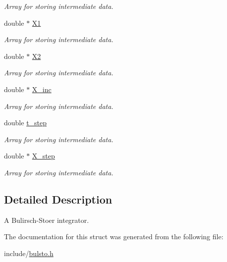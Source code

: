 \begin{DoxyCompactItemize}
\begin{DoxyCompactList}\small\item\em Array for storing intermediate data. \end{DoxyCompactList}\item 
\hypertarget{structbulsto_ae042d246b8cc4fc2dca7eeb2b7de41a0}{double $\ast$ \hyperlink{structbulsto_ae042d246b8cc4fc2dca7eeb2b7de41a0}{X1}}\label{structbulsto_ae042d246b8cc4fc2dca7eeb2b7de41a0}

\begin{DoxyCompactList}\small\item\em Array for storing intermediate data. \end{DoxyCompactList}\item 
\hypertarget{structbulsto_a07d3f69a611b1f3d346615d8936672ce}{double $\ast$ \hyperlink{structbulsto_a07d3f69a611b1f3d346615d8936672ce}{X2}}\label{structbulsto_a07d3f69a611b1f3d346615d8936672ce}

\begin{DoxyCompactList}\small\item\em Array for storing intermediate data. \end{DoxyCompactList}\item 
\hypertarget{structbulsto_ad3ed4caf9c6fac621f0712b5162c0948}{double $\ast$ \hyperlink{structbulsto_ad3ed4caf9c6fac621f0712b5162c0948}{X\-\_\-inc}}\label{structbulsto_ad3ed4caf9c6fac621f0712b5162c0948}

\begin{DoxyCompactList}\small\item\em Array for storing intermediate data. \end{DoxyCompactList}\item 
\hypertarget{structbulsto_aa8ddc55838fa4eef090464cd6c523b1b}{double \hyperlink{structbulsto_aa8ddc55838fa4eef090464cd6c523b1b}{t\-\_\-step}}\label{structbulsto_aa8ddc55838fa4eef090464cd6c523b1b}

\begin{DoxyCompactList}\small\item\em Array for storing intermediate data. \end{DoxyCompactList}\item 
\hypertarget{structbulsto_abda965d700144ad6697fb51a52c15d19}{double $\ast$ \hyperlink{structbulsto_abda965d700144ad6697fb51a52c15d19}{X\-\_\-step}}\label{structbulsto_abda965d700144ad6697fb51a52c15d19}

\begin{DoxyCompactList}\small\item\em Array for storing intermediate data. \end{DoxyCompactList}\end{DoxyCompactItemize}


\subsection{Detailed Description}
A Bulirsch-\/\-Stoer integrator. 

The documentation for this struct was generated from the following file\-:\begin{DoxyCompactItemize}
\item 
include/\hyperlink{bulsto_8h}{bulsto.\-h}\end{DoxyCompactItemize}
